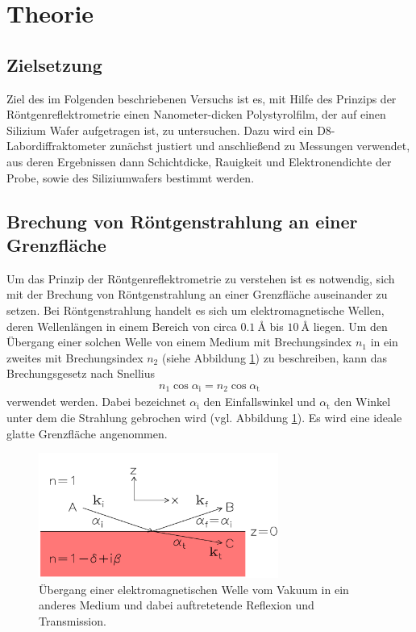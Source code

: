\section{Theorie}
\label{sec:Theorie}

\subsection{Zielsetzung}
\label{subsec:zielsetzung}
Ziel des im Folgenden beschriebenen Versuchs ist es,
mit Hilfe des Prinzips der Röntgenreflektrometrie
einen Nanometer-dicken Polystyrolfilm, der auf einen Silizium
Wafer aufgetragen ist, zu untersuchen.
Dazu wird ein D8-Labordiffraktometer zunächst justiert und anschließend zu
Messungen verwendet, aus deren Ergebnissen dann Schichtdicke, Rauigkeit und
Elektronendichte der Probe, sowie des Siliziumwafers bestimmt werden.


\subsection{Brechung von Röntgenstrahlung an einer Grenzfläche}
\label{subsec:einschicht}
Um das Prinzip der Röntgenreflektrometrie zu verstehen ist es notwendig,
sich mit der Brechung von Röntgenstrahlung an einer Grenzfläche auseinander
zu setzen.
Bei Röntgenstrahlung handelt es sich um elektromagnetische Wellen, deren
Wellenlängen in einem Bereich von circa $\SI{0.1}{\angstrom}$ bis
$\SI{10}{\angstrom}$ liegen.
Um den Übergang einer solchen Welle von einem Medium mit Brechungsindex $n_{1}$
in ein zweites mit Brechungsindex $n_{2}$ (siehe Abbildung \ref{fig:einschicht})
zu beschreiben, kann das Brechungsgesetz nach Snellius
\begin{align}
  n_{1} \cos\alpha_{\text{i}} = n_{2} \cos\alpha_{\text{t}}
  \label{eqn:snellius}
\end{align}
verwendet werden. Dabei bezeichnet $\alpha_{\text{i}}$ den Einfallswinkel
und $\alpha_{\text{t}}$ den Winkel unter dem die Strahlung gebrochen wird
(vgl. Abbildung \ref{fig:einschicht}). Es wird eine ideale glatte Grenzfläche
angenommen. \\

\FloatBarrier
\begin{figure}
  \centering
  \includegraphics[width=0.7\textwidth]{bilder/einschicht.png}
  \caption{Übergang einer elektromagnetischen Welle vom Vakuum in ein
            anderes Medium und dabei auftretetende Reflexion und Transmission.\cite{sample}}
  \label{fig:einschicht}
\end{figure}
\FloatBarrier

